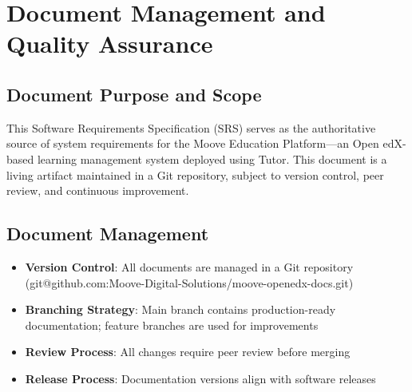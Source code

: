 \def\docTitle{Software Requirements Specification (SRS)}
\def\docVersion{3.1}
\def\docDate{July 20, 2026}



\usepackage{longtable}
\usepackage{booktabs}
\usepackage{colortbl}   %



\sloppy



\tableofcontents
\newpage

\listoftables
{}
\newpage

\listoffigures
{}
\newpage

\section{Document Management and Quality Assurance}

\subsection{Document Purpose and Scope}
This Software Requirements Specification (SRS) serves as the authoritative source of system requirements for the Moove Education Platform—an Open edX-based learning management system deployed using Tutor. This document is a living artifact maintained in a Git repository, subject to version control, peer review, and continuous improvement.

\subsection{Document Management}
\begin{itemize}
    \item \textbf{Version Control}: All documents are managed in a Git repository (git@github.com:Moove-Digital-Solutions/moove-openedx-docs.git)
    \item \textbf{Branching Strategy}: Main branch contains production-ready documentation; feature branches are used for improvements
    \item \textbf{Review Process}: All changes require peer review before merging
    \item \textbf{Release Process}: Documentation versions align with software releases
\end{itemize}

